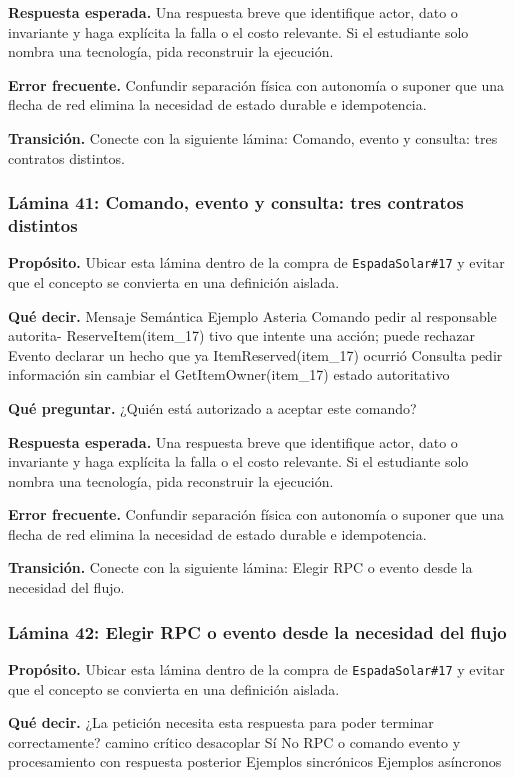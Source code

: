 \documentclass[variant=docente,cover=institutional,mode=screen]{ua-engineering-v6-article}
\begin{document}
\textbf{Respuesta esperada.} Una respuesta breve que identifique actor, dato o invariante y haga explícita la falla o el costo relevante. Si el estudiante solo nombra una tecnología, pida reconstruir la ejecución.

\textbf{Error frecuente.} Confundir separación física con autonomía o suponer que una flecha de red elimina la necesidad de estado durable e idempotencia.

\textbf{Transición.} Conecte con la siguiente lámina: Comando, evento y consulta: tres contratos distintos.

\subsubsection*{Lámina 41: Comando, evento y consulta: tres contratos distintos}
\textbf{Propósito.} Ubicar esta lámina dentro de la compra de \texttt{EspadaSolar\#17} y evitar que el concepto se convierta en una definición aislada.

\textbf{Qué decir.} Mensaje Semántica Ejemplo Asteria Comando pedir al responsable autorita- ReserveItem(item\_17) tivo que intente una acción; puede rechazar Evento declarar un hecho que ya ItemReserved(item\_17) ocurrió Consulta pedir información sin cambiar el GetItemOwner(item\_17) estado autoritativo

\textbf{Qué preguntar.} ¿Quién está autorizado a aceptar este comando?

\textbf{Respuesta esperada.} Una respuesta breve que identifique actor, dato o invariante y haga explícita la falla o el costo relevante. Si el estudiante solo nombra una tecnología, pida reconstruir la ejecución.

\textbf{Error frecuente.} Confundir separación física con autonomía o suponer que una flecha de red elimina la necesidad de estado durable e idempotencia.

\textbf{Transición.} Conecte con la siguiente lámina: Elegir RPC o evento desde la necesidad del flujo.

\subsubsection*{Lámina 42: Elegir RPC o evento desde la necesidad del flujo}
\textbf{Propósito.} Ubicar esta lámina dentro de la compra de \texttt{EspadaSolar\#17} y evitar que el concepto se convierta en una definición aislada.

\textbf{Qué decir.} ¿La petición necesita esta respuesta para poder terminar correctamente? camino crítico desacoplar Sí No RPC o comando evento y procesamiento con respuesta posterior Ejemplos sincrónicos Ejemplos asíncronos
\end{document}
